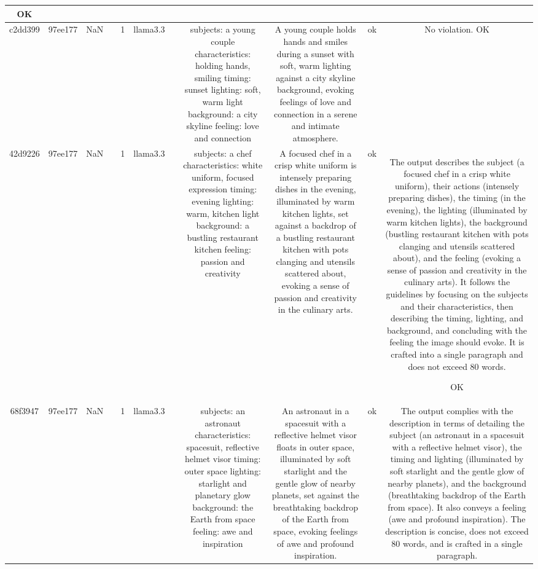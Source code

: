 \begin{table}[h!]
\begin{tabular}{|c|c|c|c|c|c|c|c|c|c|c|}
OK\\
\hline
c2dd399 & 97ee177 & NaN &  & 1 & llama3.3 &  & subjects: a young couple
characteristics: holding hands, smiling
timing: sunset
lighting: soft, warm light
background: a city skyline
feeling: love and connection & A young couple holds hands and smiles during a sunset with soft, warm lighting against a city skyline background, evoking feelings of love and connection in a serene and intimate atmosphere. & ok & No violation.
OK\\
\hline
42d9226 & 97ee177 & NaN &  & 1 & llama3.3 &  & subjects: a chef
characteristics: white uniform, focused expression
timing: evening
lighting: warm, kitchen light
background: a bustling restaurant kitchen
feeling: passion and creativity & A focused chef in a crisp white uniform is intensely preparing dishes in the evening, illuminated by warm kitchen lights, set against a backdrop of a bustling restaurant kitchen with pots clanging and utensils scattered about, evoking a sense of passion and creativity in the culinary arts. & ok & The output describes the subject (a focused chef in a crisp white uniform), their actions (intensely preparing dishes), the timing (in the evening), the lighting (illuminated by warm kitchen lights), the background (bustling restaurant kitchen with pots clanging and utensils scattered about), and the feeling (evoking a sense of passion and creativity in the culinary arts). It follows the guidelines by focusing on the subjects and their characteristics, then describing the timing, lighting, and background, and concluding with the feeling the image should evoke. It is crafted into a single paragraph and does not exceed 80 words.

OK\\
\hline
68f3947 & 97ee177 & NaN &  & 1 & llama3.3 &  & subjects: an astronaut
characteristics: spacesuit, reflective helmet visor
timing: outer space
lighting: starlight and planetary glow
background: the Earth from space
feeling: awe and inspiration & An astronaut in a spacesuit with a reflective helmet visor floats in outer space, illuminated by soft starlight and the gentle glow of nearby planets, set against the breathtaking backdrop of the Earth from space, evoking feelings of awe and profound inspiration. & ok & The output complies with the description in terms of detailing the subject (an astronaut in a spacesuit with a reflective helmet visor), the timing and lighting (illuminated by soft starlight and the gentle glow of nearby planets), and the background (breathtaking backdrop of the Earth from space). It also conveys a feeling (awe and profound inspiration). The description is concise, does not exceed 80 words, and is crafted in a single paragraph. 


\end{tabular}
\end{table}
